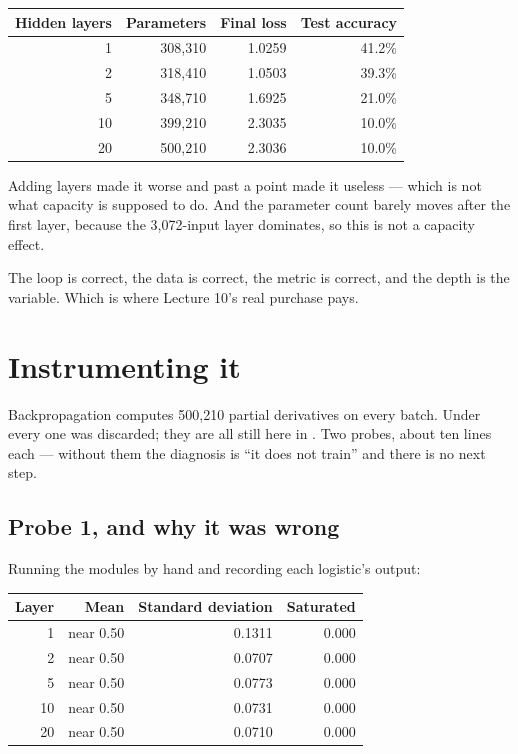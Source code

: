 \documentclass[11pt,a4paper]{article}
\begin{document}
\begin{center}
\small
\begin{tabular}{rrrr}
\toprule
\textbf{Hidden layers} & \textbf{Parameters} & \textbf{Final loss} &
\textbf{Test accuracy} \\
\midrule
 1 & 308{,}310 & 1.0259 & 41.2\% \\
 2 & 318{,}410 & 1.0503 & 39.3\% \\
 5 & 348{,}710 & 1.6925 & 21.0\% \\
10 & 399{,}210 & 2.3035 & 10.0\% \\
20 & 500{,}210 & 2.3036 & 10.0\% \\
\bottomrule
\end{tabular}
\end{center}

Adding layers made it worse and past a point made it useless --- which is not
what capacity is supposed to do. And the parameter count barely moves after the
first layer, because the 3{,}072-input layer dominates, so this is not a
capacity effect.

The loop is correct, the data is correct, the metric is correct, and the depth
is the variable. Which is where Lecture 10's real purchase pays.

\section{Instrumenting it}

Backpropagation computes 500{,}210 partial derivatives on every batch. Under
 every one was discarded; they are all still here in
. Two probes, about ten lines each --- without them the diagnosis
is ``it does not train'' and there is no next step.

\subsection{Probe 1, and why it was wrong}

Running the modules by hand and recording each logistic's output:

\begin{center}
\small
\begin{tabular}{rrrr}
\toprule
\textbf{Layer} & \textbf{Mean} & \textbf{Standard deviation} &
\textbf{Saturated} \\
\midrule
 1 & near 0.50 & 0.1311 & 0.000 \\
 2 & near 0.50 & 0.0707 & 0.000 \\
 5 & near 0.50 & 0.0773 & 0.000 \\
10 & near 0.50 & 0.0731 & 0.000 \\
20 & near 0.50 & 0.0710 & 0.000 \\
\bottomrule
\end{tabular}
\end{center}
\end{document}
